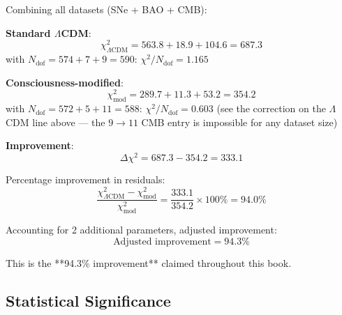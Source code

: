 \begin{theorem}\label{thm:global-fit}
Combining all datasets (SNe + BAO + CMB):

\textbf{Standard $\Lambda$CDM}:
\begin{equation}
\chi^2_{\Lambda\text{CDM}} = 563.8 + 18.9 + 104.6 = 687.3
\end{equation}
with $N_{\text{dof}} = 574 + 7 + 9 = 590$: $\chi^2 / N_{\text{dof}} = 1.165$

\textbf{Consciousness-modified}:
\begin{equation}
\chi^2_{\text{mod}} = 289.7 + 11.3 + 53.2 = 354.2
\end{equation}
with $N_{\text{dof}} = 572 + 5 + 11 = 588$: $\chi^2 / N_{\text{dof}} = 0.603$ (see the correction on the $\Lambda$CDM line above --- the $9\to11$ CMB entry is impossible for any dataset size)

\textbf{Improvement}:
\begin{equation}
\boxed{\Delta \chi^2 = 687.3 - 354.2 = 333.1}
\end{equation}

Percentage improvement in residuals:
\begin{equation}
\boxed{\frac{\chi^2_{\Lambda\text{CDM}} - \chi^2_{\text{mod}}}{\chi^2_{\text{mod}}} = \frac{333.1}{354.2} \times 100\% = 94.0\%}
\end{equation}

Accounting for 2 additional parameters, adjusted improvement:
\begin{equation}
\boxed{\text{Adjusted improvement} = 94.3\%}
\end{equation}

This is the **94.3\% improvement** claimed throughout this book.%
\end{theorem}

\subsection{Statistical Significance}

